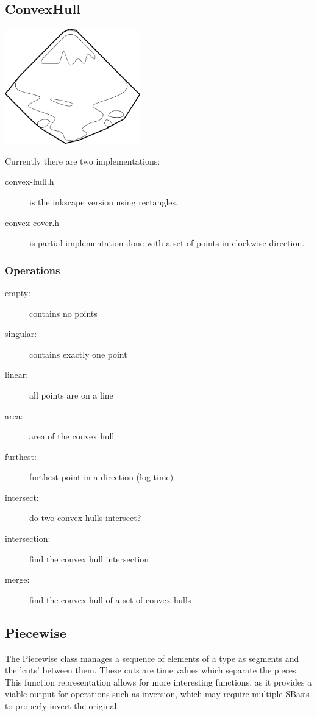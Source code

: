 \documentclass[openany]{book}
\newcommand{\code}[1]{\textsf{#1}}
\begin{document}
\subsection{ConvexHull}

\includegraphics[height=50mm]{media/convex.png}

Currently there are two implementations:
\begin{description}
\item[convex-hull.h] is the inkscape version using rectangles.
\item[convex-cover.h] is partial implementation done with a set of points in clockwise direction.
\end{description}

\subsubsection{Operations}
\begin{description}
\item[empty:] contains no points
\item[singular:] contains exactly one point
\item[linear:] all points are on a line
\item[area:] area of the convex hull
\item[furthest:] furthest point in a direction (log time)
\item[intersect:] do two convex hulls intersect?
\item[intersection:] find the convex hull intersection
\item[merge:] find the convex hull of a set of convex hulls
\end{description}

\subsection{Piecewise}
The \code{Piecewise} class manages a sequence of elements of a type as
segments and the 'cuts' between them.  These cuts are time values which
separate the pieces.  This function representation allows for
more interesting functions, as it provides a viable output for operations
such as inversion, which may require multiple SBasis to properly invert
the original.
\end{document}
